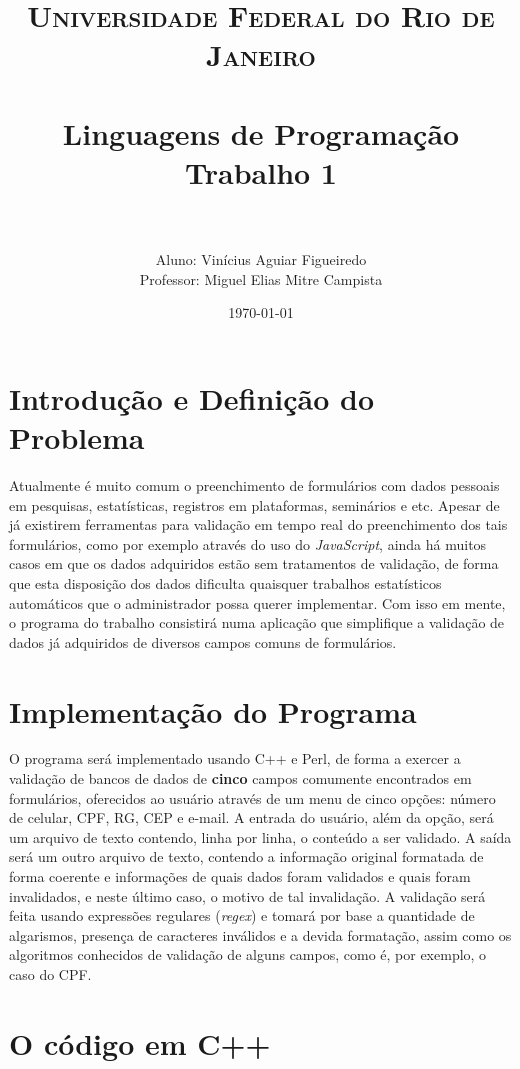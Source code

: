 \documentclass[paper=a4, fontsize=11pt]{scrartcl} %
\title{	
\normalfont \normalsize 
\textsc{Universidade Federal do Rio de Janeiro} \\ [25pt] %
\horrule{0.5pt} \\[0.4cm] %
\huge Linguagens de Programação \\
\huge Trabalho 1 \\ %
\horrule{2pt} \\[0.5cm] %
}
\author{Aluno: Vinícius Aguiar Figueiredo \\
		Professor: Miguel Elias Mitre Campista} %
\date{\normalsize\today} %
\numberwithin{equation}{section} %
\numberwithin{figure}{section} %
\numberwithin{table}{section} %
\begin{document}
\maketitle %
\clearpage

\section{Introdução e Definição do Problema}

Atualmente é muito comum o preenchimento de formulários com dados pessoais em pesquisas, estatísticas, registros em plataformas, seminários e etc. Apesar de já existirem ferramentas para validação em tempo real do preenchimento dos tais formulários, como por exemplo através do uso do \textit{JavaScript}, ainda há muitos casos em que os dados adquiridos estão sem tratamentos de validação, de forma que esta disposição dos dados dificulta quaisquer trabalhos estatísticos automáticos que o administrador possa querer implementar. Com isso em mente, o programa do trabalho consistirá numa aplicação que simplifique a validação de dados já adquiridos de diversos campos comuns de formulários. 

\section{Implementação do Programa}

O programa será implementado usando C++ e Perl, de forma a exercer a validação de bancos de dados de \textbf{cinco} campos comumente encontrados em formulários, oferecidos ao usuário através de um menu de cinco opções: número de celular, CPF, RG, CEP e e-mail. A entrada do usuário, além da opção, será um arquivo de texto contendo, linha por linha, o conteúdo a ser validado. A saída será um outro arquivo de texto, contendo  a informação original formatada de forma coerente e informações de quais dados foram validados e quais foram invalidados, e neste último caso, o motivo de tal invalidação. A validação será feita usando expressões regulares (\textit{regex}) e tomará por base a quantidade de algarismos, presença de caracteres inválidos e a devida formatação, assim como os algoritmos conhecidos de validação de alguns campos, como é, por exemplo, o caso do CPF.  

\section{O código em C++}
\end{document}
